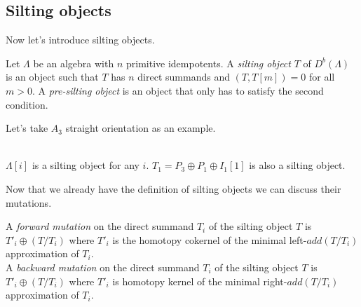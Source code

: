 \subsection{Silting objects}
\indent Now let's introduce silting objects.\\ %
\begin{definition}
Let $\Lambda$ be an algebra with $n$ primitive idempotents. A \textit{silting object} $T$ of $D^b(\Lambda)$ is an object such that $T$ has $n$ direct summands and $(T,T[m])=0$ for all $m>0$. A \textit{pre-silting object} is an object that only has to satisfy the second condition.\\
\end{definition}
\begin{example}
\indent Let's take $A_3$ straight orientation as an example.\\
\\
\indent $\Lambda[i]$ is a silting object for any $i$. $T_1=P_3\oplus P_1 \oplus I_1[1]$ is also a silting object.
\end{example}
\indent Now that we already have the definition of silting objects we can discuss their mutations.\\
\begin{definition}
A \textit{forward mutation} on the direct summand $T_i$ of the silting object $T$ is $T'_i\oplus (T/T_i)$ where $T'_i$ is the homotopy cokernel of the minimal left-$add (T/T_i)$ approximation of $T_i$.\\
A \textit{backward mutation} on the direct summand $T_i$ of the silting object $T$ is $T'_i\oplus (T/T_i)$ where $T'_i$ is homotopy kernel of the minimal right-$add (T/T_i)$ approximation of $T_i$.
\end{definition}

